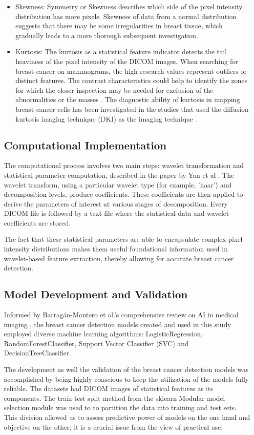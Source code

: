 \begin{itemize}
  \item Skewness: Symmetry or Skewness describes which side of the pixel intensity distribution has more pixels. Skewness of data from a normal distribution suggests that there may be some irregularities in breast tissue, which gradually leads to a more thorough subsequent investigation.
  \item Kurtosis: The kurtosis as a statistical feature indicator detects the tail heaviness of the pixel intensity of the DICOM images. When searching for breast cancer on mammograms, the high research values represent outliers or distinct features. The contrast characteristics could help to identify the zones for which the closer inspection may be needed for exclusion of the abnormalities or the masses \cite{li2020diagnostic}. The diagnostic ability of kurtosis in mapping breast cancer cells has been investigated in the studies that used the diffusion kurtosis imaging technique (DKI) as the imaging technique \cite{li2020diagnostic}.
\end{itemize}
\subsection{Computational Implementation}
The computational process involves two main steps: wavelet transformation and statistical parameter computation, described in the paper by Yan et al \cite{YAN2006285} . The wavelet transform, using a particular wavelet type (for example, 'haar') and decomposition levels, produce coefficients. These coefficients are then applied to derive the parameters of interest at various stages of decomposition. Every DICOM file is followed by a text file where the statistical data and wavelet coefficients are stored.

The fact that these statistical parameters are able to encapsulate complex pixel intensity distributions makes them useful foundational information used in wavelet-based feature extraction, thereby allowing for accurate breast cancer detection.
\subsection{Model Development and Validation}
Informed by Barragán-Montero et al.'s comprehensive review on AI in medical imaging \cite{barragan2021artificial}, the breast cancer detection models created and used in this study employed diverse machine learning algorithms: LogisticRegression, RandomForestClassifier, Support Vector Classifier (SVC) and DecisionTreeClassifier.

The development as well the validation of the breast cancer detection models was accomplished by being highly conscious to keep the utilization of the models fully reliable. The datasets had DICOM images of statistical features as its components. The train test split method from the sklearn Modular model selection module was used to to partition the data into training and test sets. This division allowed us to assess predictive power of models on the one hand and objective on the other: it is a crucial issue from the view of practical use.
